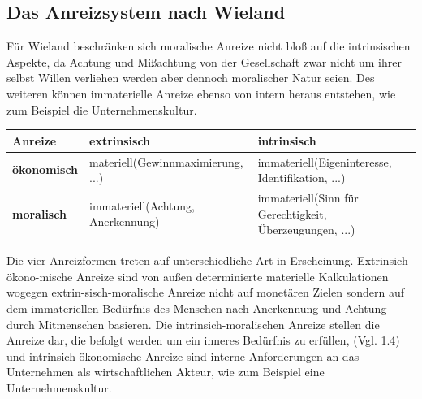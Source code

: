 \documentclass[12pt]{article}
\begin{document}
\subsection{Das Anreizsystem nach Wieland}
Für Wieland beschränken sich moralische Anreize nicht bloß auf die intrinsischen Aspekte, da Achtung und Mißachtung von der Gesellschaft zwar nicht um ihrer selbst Willen verliehen werden aber dennoch moralischer Natur seien. Des weiteren können immaterielle Anreize ebenso von intern heraus entstehen, wie zum Beispiel die Unternehmenskultur.
\begin{center}
\begin{tabular}{|p{3cm}|p{5cm}|p{5cm}|}
\hline
Anreize & \textbf{extrinsisch} & \textbf{intrinsisch}\\\hline
\textbf{ökonomisch} & materiell\newline(Gewinnmaximierung, ...) & immateriell\newline (Eigeninteresse, Identifikation, ...)\\\hline
\textbf{moralisch} & immateriell\newline (Achtung, Anerkennung) & immateriell\newline(Sinn für Gerechtigkeit, Überzeugungen, ...)\\\hline
\end{tabular}
\end{center}
Die vier Anreizformen treten auf unterschiedliche Art in Erscheinung. Extrinsich-ökono-mische Anreize sind von außen determinierte materielle Kalkulationen wogegen extrin-sisch-moralische Anreize nicht auf monetären Zielen sondern auf dem immateriellen Bedürfnis des Menschen nach Anerkennung und Achtung durch Mitmenschen basieren. Die intrinsich-moralischen Anreize stellen die Anreize dar, die befolgt werden um ein inneres Bedürfnis zu erfüllen, (Vgl. 1.4) und intrinsich-ökonomische Anreize sind interne Anforderungen an das Unternehmen als wirtschaftlichen Akteur, wie zum Beispiel eine Unternehmenskultur.
\end{document}
